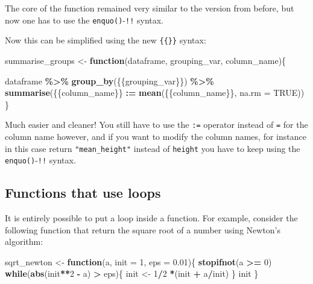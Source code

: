 \documentclass[
]{article}
\newenvironment{Shaded}{\begin{snugshade}}{\end{snugshade}}
\newcommand{\ControlFlowTok}[1]{\textcolor[rgb]{0.13,0.29,0.53}{\textbf{#1}}}
\newcommand{\DataTypeTok}[1]{\textcolor[rgb]{0.13,0.29,0.53}{#1}}
\newcommand{\DecValTok}[1]{\textcolor[rgb]{0.00,0.00,0.81}{#1}}
\newcommand{\ErrorTok}[1]{\textcolor[rgb]{0.64,0.00,0.00}{\textbf{#1}}}
\newcommand{\FloatTok}[1]{\textcolor[rgb]{0.00,0.00,0.81}{#1}}
\newcommand{\KeywordTok}[1]{\textcolor[rgb]{0.13,0.29,0.53}{\textbf{#1}}}
\newcommand{\NormalTok}[1]{#1}
\newcommand{\OperatorTok}[1]{\textcolor[rgb]{0.81,0.36,0.00}{\textbf{#1}}}
\newcommand{\OtherTok}[1]{\textcolor[rgb]{0.56,0.35,0.01}{#1}}
\newcommand{\StringTok}[1]{\textcolor[rgb]{0.31,0.60,0.02}{#1}}
\begin{document}
The core of the function remained very similar to the version from before, but now one has to
use the \texttt{enquo()}-\texttt{!!} syntax.

Now this can be simplified using the new \texttt{\{\{\}\}} syntax:

\begin{Shaded}
\begin{Highlighting}[]
\NormalTok{summarise\_groups \textless{}{-}}\StringTok{ }\ControlFlowTok{function}\NormalTok{(dataframe, grouping\_var, column\_name)\{}

\NormalTok{  dataframe }\OperatorTok{\%\textgreater{}\%}
\StringTok{    }\KeywordTok{group\_by}\NormalTok{(\{\{grouping\_var\}\}) }\OperatorTok{\%\textgreater{}\%}\StringTok{  }
\StringTok{    }\KeywordTok{summarise}\NormalTok{(\{\{column\_name\}\} }\OperatorTok{:}\ErrorTok{=}\StringTok{ }\KeywordTok{mean}\NormalTok{(\{\{column\_name\}\}, }\DataTypeTok{na.rm =} \OtherTok{TRUE}\NormalTok{))}
\NormalTok{\}}
\end{Highlighting}
\end{Shaded}

Much easier and cleaner! You still have to use the \texttt{:=} operator instead of \texttt{=} for the column name
however, and if you want to modify the column names, for instance in this
case return \texttt{"mean\_height"} instead of \texttt{height} you have to keep using the \texttt{enquo()}-\texttt{!!} syntax.

\hypertarget{functions-that-use-loops}{%
\subsection{Functions that use loops}\label{functions-that-use-loops}}

It is entirely possible to put a loop inside a function. For example, consider the following
function that return the square root of a number using Newton's algorithm:

\begin{Shaded}
\begin{Highlighting}[]
\NormalTok{sqrt\_newton \textless{}{-}}\StringTok{ }\ControlFlowTok{function}\NormalTok{(a, }\DataTypeTok{init =} \DecValTok{1}\NormalTok{, }\DataTypeTok{eps =} \FloatTok{0.01}\NormalTok{)\{}
    \KeywordTok{stopifnot}\NormalTok{(a }\OperatorTok{\textgreater{}=}\StringTok{ }\DecValTok{0}\NormalTok{)}
    \ControlFlowTok{while}\NormalTok{(}\KeywordTok{abs}\NormalTok{(init}\OperatorTok{**}\DecValTok{2} \OperatorTok{{-}}\StringTok{ }\NormalTok{a) }\OperatorTok{\textgreater{}}\StringTok{ }\NormalTok{eps)\{}
\NormalTok{        init \textless{}{-}}\StringTok{ }\DecValTok{1}\OperatorTok{/}\DecValTok{2} \OperatorTok{*}\NormalTok{(init }\OperatorTok{+}\StringTok{ }\NormalTok{a}\OperatorTok{/}\NormalTok{init)}
\NormalTok{    \}}
\NormalTok{    init}
\NormalTok{\}}
\end{Highlighting}
\end{Shaded}
\end{document}
